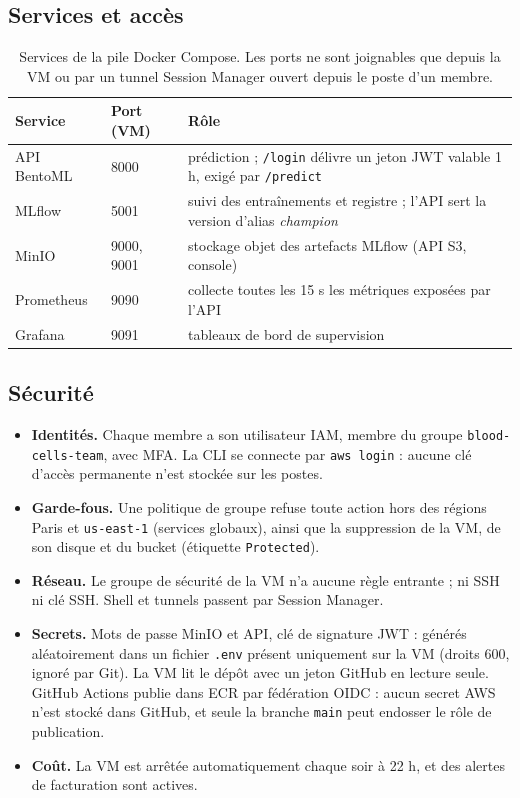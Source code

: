 \subsection{Services et accès}

\begin{table}[H]
\centering
\small
\begin{tabularx}{\linewidth}{@{}l l X@{}}
\toprule
\textbf{Service} & \textbf{Port (VM)} & \textbf{Rôle} \\
\midrule
API BentoML & 8000 & prédiction ; \texttt{/login} délivre un jeton JWT valable 1 h, exigé par \texttt{/predict} \\
MLflow      & 5001 & suivi des entraînements et registre ; l'API sert la version d'alias \emph{champion} \\
MinIO       & 9000, 9001 & stockage objet des artefacts MLflow (API S3, console) \\
Prometheus  & 9090 & collecte toutes les 15 s les métriques exposées par l'API \\
Grafana     & 9091 & tableaux de bord de supervision \\
\bottomrule
\end{tabularx}
\caption{Services de la pile Docker Compose. Les ports ne sont joignables que
depuis la VM ou par un tunnel Session Manager ouvert depuis le poste d'un membre.}
\label{tab:services-aws}
\end{table}

\subsection{Sécurité}

\begin{itemize}[leftmargin=*]
  \item \textbf{Identités.} Chaque membre a son utilisateur IAM, membre du groupe
        \texttt{blood-cells-team}, avec MFA. La CLI se connecte par
        \texttt{aws login} : aucune clé d'accès permanente n'est stockée sur les postes.
  \item \textbf{Garde-fous.} Une politique de groupe refuse toute action hors
        des régions Paris et \texttt{us-east-1} (services globaux), ainsi que la
        suppression de la VM, de son disque et du bucket (étiquette \texttt{Protected}).
  \item \textbf{Réseau.} Le groupe de sécurité de la VM n'a aucune règle entrante ;
        ni SSH ni clé SSH. Shell et tunnels passent par Session Manager.
  \item \textbf{Secrets.} Mots de passe MinIO et API, clé de signature JWT :
        générés aléatoirement dans un fichier \texttt{.env} présent uniquement sur
        la VM (droits 600, ignoré par Git). La VM lit le dépôt avec un jeton
        GitHub en lecture seule. GitHub Actions publie dans ECR par fédération
        OIDC : aucun secret AWS n'est stocké dans GitHub, et seule la branche
        \texttt{main} peut endosser le rôle de publication.
  \item \textbf{Coût.} La VM est arrêtée automatiquement chaque soir à 22 h, et des
        alertes de facturation sont actives.
\end{itemize}

